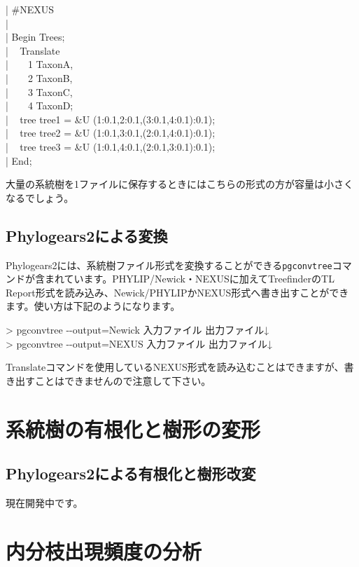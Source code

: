 \documentclass[titlepage,10pt,a4paper]{jsbook}
\newenvironment{content}{\begin{shaded}\vspace{-1em}\raggedright\ttfamily\footnotesize\setlength{\baselineskip}{1.4em}}{\end{shaded}\vspace{-1em}}
\newenvironment{cmd}{\begin{oframed}\raggedright\ttfamily\footnotesize\setlength{\baselineskip}{1.4em}}{\end{oframed}\vspace{-1em}}
\begin{document}
\begin{content}
| \#NEXUS\\
| ~\\
| Begin Trees;\\
| ~ Translate\\
| ~ ~ 1 TaxonA,\\
| ~ ~ 2 TaxonB,\\
| ~ ~ 3 TaxonC,\\
| ~ ~ 4 TaxonD;\\
| ~ tree tree{\textunderscore}1 = {\lbrack}\&U{\rbrack} (1:0.1,2:0.1,(3:0.1,4:0.1):0.1);\\
| ~ tree tree{\textunderscore}2 = {\lbrack}\&U{\rbrack} (1:0.1,3:0.1,(2:0.1,4:0.1):0.1);\\
| ~ tree tree{\textunderscore}3 = {\lbrack}\&U{\rbrack} (1:0.1,4:0.1,(2:0.1,3:0.1):0.1);\\
| End;
\end{content}
大量の系統樹を1ファイルに保存するときにはこちらの形式の方が容量は小さくなるでしょう。

\subsection{Phylogears2による変換}

Phylogears2には、系統樹ファイル形式を変換することができる\texttt{pgconvtree}コマンドが含まれています。PHYLIP/Newick・NEXUSに加えてTreefinderのTL Report形式を読み込み、Newick/PHYLIPかNEXUS形式へ書き出すことができます。使い方は下記のようになります。
\begin{cmd}
{\textgreater} pgconvtree {-}{-}output=Newick 入力ファイル 出力ファイル↓\\
{\textgreater} pgconvtree {-}{-}output=NEXUS 入力ファイル 出力ファイル↓
\end{cmd}
Translateコマンドを使用しているNEXUS形式を読み込むことはできますが、書き出すことはできませんので注意して下さい。

\section{系統樹の有根化と樹形の変形}

\subsection{Phylogears2による有根化と樹形改変}

現在開発中です。

\section{内分枝出現頻度の分析}\label{section:cladecredibility}
\end{document}
